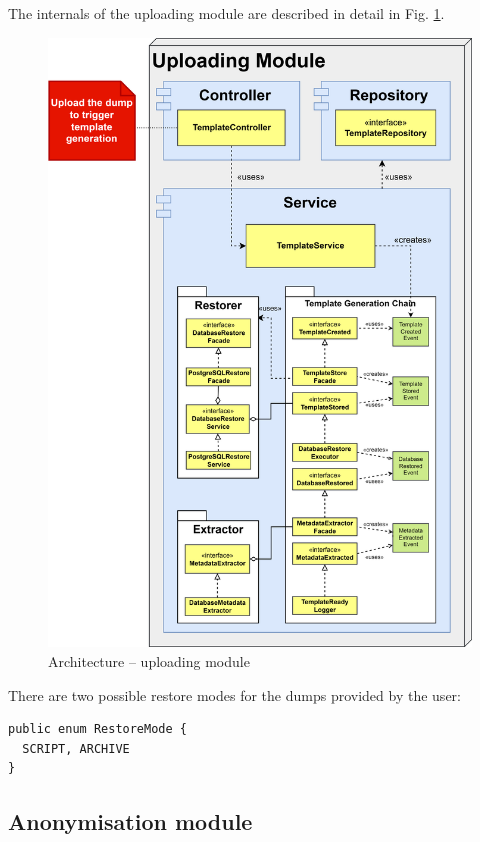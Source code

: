 \documentclass[a4paper,twoside,12pt]{book}
\begin{document}
The internals of the uploading module are described in detail in  Fig. \ref{fig:architecture_uploading}.
%
\begin{figure}
  \centering
  \includegraphics[width=\linewidth]{img/architecture_uploading.png}
  \caption{Architecture – uploading module}
  \label{fig:architecture_uploading}
\end{figure}
%
%
There are two possible restore modes for the dumps provided by the user:
\begin{verbatim}
public enum RestoreMode {
  SCRIPT, ARCHIVE
}
\end{verbatim}

\subsection{Anonymisation module}
\end{document}
